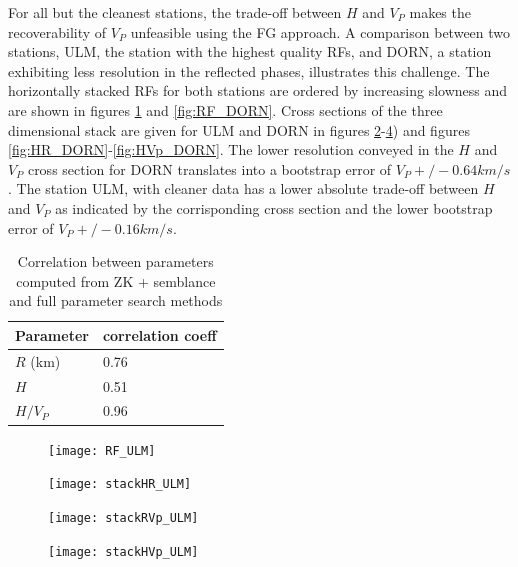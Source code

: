 \documentclass[draft, 12pt]{article}
\begin{document}
For all but the cleanest stations, the trade-off between $H$ and $V_P$ makes the recoverability of $V_P$ unfeasible using the FG approach. A comparison between two stations, ULM, the station with the highest quality RFs, and DORN, a station exhibiting less resolution in the reflected phases, illustrates this challenge. The horizontally stacked RFs for both stations are ordered by increasing slowness and are shown in figures \ref{fig:RF_ULM} and \ref{fig:RF_DORN}. Cross sections of the three dimensional stack are given for ULM and DORN in figures \ref{fig:HR_ULM}-\ref{fig:HVp_ULM}) and figures \ref{fig:HR_DORN}-\ref{fig:HVp_DORN}. The lower resolution conveyed in the $H$ and $V_P$ cross section for DORN translates into a bootstrap error of $V_P +/- 0.64 km/s$. The station ULM, with cleaner data has a lower absolute trade-off between $H$ and $V_P$ as indicated by the corrisponding cross section and the lower bootstrap error of $V_P +/- 0.16 km/s$.

\begin{table}
  \begin{tabular}{ l l }
    \hline
    Parameter & correlation coeff \\
    \hline
    $R$ (km) &  0.76 \\
    $H$      &  0.51 \\
    $H/V_P$  &  0.96 \\
    \hline
  \end{tabular}
  \caption{Correlation between parameters computed from ZK + semblance and full parameter search methods}
\label{table:ZKvsFG}

\end{table}


\begin{figure}
  \centering
  \texttt{[image: RF\_ULM]}
  \caption{}
  \label{fig:RF_ULM}
\end{figure}

\begin{figure}
  \centering
  \texttt{[image: stackHR\_ULM]}
  \caption{}
  \label{fig:HR_ULM}
\end{figure}

\begin{figure}
  \centering
  \texttt{[image: stackRVp\_ULM]}
  \caption{}
  \label{fig:RVp_ULM}
\end{figure}

\begin{figure}
  \centering
  \texttt{[image: stackHVp\_ULM]}
  \caption{}
  \label{fig:HVp_ULM}
\end{figure}
\end{document}
